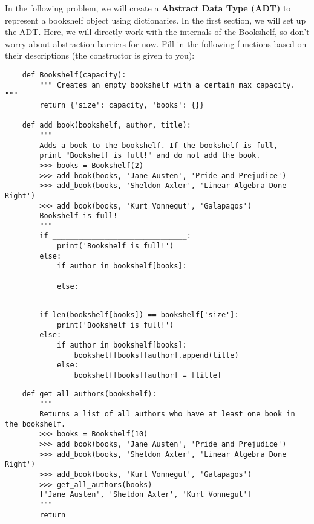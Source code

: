 
    In the following problem, we will create a \textbf{Abstract Data Type (ADT)} to represent 
    a bookshelf object using dictionaries.
    \newline
    \newline
    In the first section, we will set up the ADT. Here, we will directly work with the internals of the
    Bookshelf, so don't worry about abstraction barriers for now. Fill in the following functions based
    on their descriptions (the constructor is given to you):
    
    \begin{lstlisting}
    def Bookshelf(capacity):
        """ Creates an empty bookshelf with a certain max capacity. """
        return {'size': capacity, 'books': {}}

    def add_book(bookshelf, author, title):
        """
        Adds a book to the bookshelf. If the bookshelf is full,
        print "Bookshelf is full!" and do not add the book.
        >>> books = Bookshelf(2)
        >>> add_book(books, 'Jane Austen', 'Pride and Prejudice')
        >>> add_book(books, 'Sheldon Axler', 'Linear Algebra Done Right')
        >>> add_book(books, 'Kurt Vonnegut', 'Galapagos')
        Bookshelf is full!
        """
        if _______________________________:
            print('Bookshelf is full!')
        else:
            if author in bookshelf[books]:
                ____________________________________
            else:
                ____________________________________
    \end{lstlisting}


    \begin{solution}
        \begin{lstlisting}
        if len(bookshelf[books]) == bookshelf['size']:
            print('Bookshelf is full!')
        else:
            if author in bookshelf[books]:
                bookshelf[books][author].append(title)
            else:
                bookshelf[books][author] = [title]
        \end{lstlisting}
    \end{solution}

    \newpage
    \begin{lstlisting}
    def get_all_authors(bookshelf):
        """
        Returns a list of all authors who have at least one book in the bookshelf.
        >>> books = Bookshelf(10)
        >>> add_book(books, 'Jane Austen', 'Pride and Prejudice')
        >>> add_book(books, 'Sheldon Axler', 'Linear Algebra Done Right')
        >>> add_book(books, 'Kurt Vonnegut', 'Galapagos')
        >>> get_all_authors(books)
        ['Jane Austen', 'Sheldon Axler', 'Kurt Vonnegut']
        """
        return ___________________________________
    \end{lstlisting}

